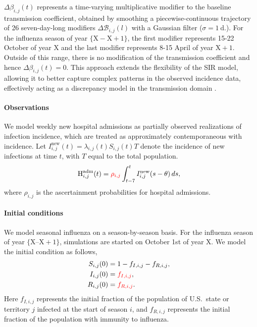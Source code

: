 \documentclass[11pt]{article}
\begin{document}
$\Delta \beta_{i,j}(t)$ represents a time-varying multiplicative modifier to the baseline transmission coefficient, obtained by smoothing a piecewise-continuous trajectory of 26 seven-day-long modifiers $\Delta \mathcal{B}_{i,j}(l)$ with a Gaussian filter ($\sigma = 1~\text{d.}$). For the influenza season of year $\{\text{X}-\text{X}+1\}$, the first modifier represents 15-22 October of year $\text{X}$ and the last modifier represents 8-15 April of year $\text{X}+1$. Outside of this range, there is no modification of the transmission coefficient and hence $\Delta \beta_{i,j}(t)=0$. This approach extends the flexibility of the SIR model, allowing it to better capture complex patterns in the observed incidence data, effectively acting as a discrepancy model in the transmission domain \citep{osthus2019}.

\paragraph{Observations} We model weekly new hospital admissions as partially observed realizations of infection incidence, which are treated as approximately contemporaneous with incidence. Let \( I_{i,j}^{\text{new}}(t) = \lambda_{i,j}(t) S_{i,j}(t) T \) denote the incidence of new infections at time \(t\), with $T$ equal to the total population. 
\begin{equation}\label{eq:observed_states}
    \text{H}^{\text{adm}}_{i,j}(t) 
    = \textcolor{red}{\rho_{i,j}} \int_{t-7}^{t} I^{\text{new}}_{i,j}(s - \theta)\, ds,
\end{equation}
where \( \rho_{i,j} \) is the ascertainment probabilities for hospital admissions.

\paragraph{Initial conditions} We model seasonal influenza on a season-by-season basis. For the influenza season of year $\{\text{X} \text{--} \text{X}+1\}$, simulations are started on October 1st of year $\text{X}$. We model the initial condition as follows,
\begin{align}\label{eq:initial_condition}
    S_{i,j}(0) &= 1- f_{I,i,j}-f_{R,i,j}, \nonumber \\
    I_{i,j}(0) &= \textcolor{red}{f_{I,i,j}}, \nonumber \\
    R_{i,j}(0) &= \textcolor{red}{f_{R,i,j}}. 
\end{align}
Here $f_{I,i,j}$ represents the initial fraction of the population of U.S.\ state or territory $j$ infected at the start of season $i$, and $f_{R,i,j}$ represents the initial fraction of the population with immunity to influenza.
\end{document}
